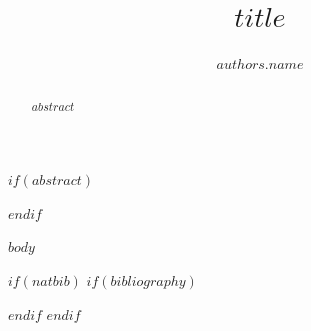 \documentclass[a4paper,UKenglish,cleveref,autoref,thm-restate]{lipics-v2021}
\title{$title$}
\author{$authors.name$}{$authors.affiliation$}{$authors.email$}{$authors.orcid$}{$authors.funding$}
\theoremstyle{definition}
\begin{document}
\maketitle

$if(abstract)$
\begin{abstract}
$abstract$
\end{abstract}
$endif$

$body$

$if(natbib)$
$if(bibliography)$

$endif$
$endif$
\end{document}
